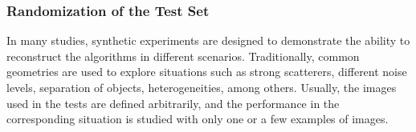 			\subsubsection{Randomization of the Test Set}\label{chap:investigation:proposal:performance:randomization}
			
				In many studies, synthetic experiments are designed to demonstrate the ability to reconstruct the algorithms in different scenarios. Traditionally, common geometries are used to explore situations such as strong scatterers, different noise levels, separation of objects, heterogeneities, among others. Usually, the images used in the tests are defined arbitrarily, and the performance in the corresponding situation is studied with only one or a few examples of images.
				
